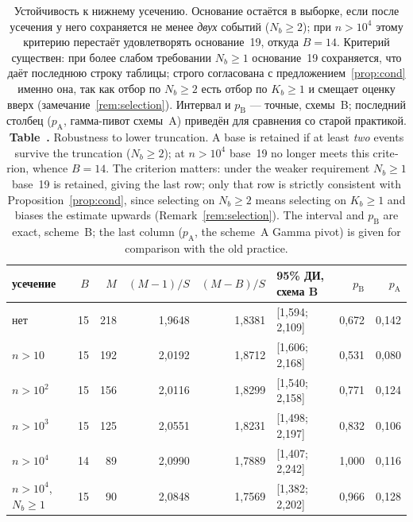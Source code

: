 \documentclass[11pt,a4paper]{article}
\newcommand{\encaptab}[1]{\\[3pt]\foreignlanguage{english}{%
  \textbf{Table~\thetable.} #1}}
\theoremstyle{plain}
\theoremstyle{remark}
\begin{document}
\begin{table}[t]
\centering
\caption{Устойчивость к нижнему усечению. Основание остаётся в выборке, если после
усечения у него сохраняется не менее \emph{двух} событий ($N_b\ge2$); при $n>10^4$ этому
критерию перестаёт удовлетворять основание~19, откуда $B=14$. Критерий существен:
при более слабом требовании $N_b\ge1$ основание~19 сохраняется, что даёт последнюю
строку таблицы; строго согласована с предложением~\ref{prop:cond} именно она, так как
отбор по $N_b\ge2$ есть отбор по $K_b\ge1$ и смещает оценку вверх
(замечание~\ref{rem:selection}). Интервал и $p_{\mathrm B}$ --- точные, схемы~B;
последний столбец ($p_{\mathrm A}$, гамма-пивот схемы~A) приведён для сравнения
со старой практикой.
\encaptab{Robustness to lower truncation. A base is retained if at least
\emph{two} events survive the truncation ($N_b\ge2$); at $n>10^4$ base~19 no longer
meets this criterion, whence $B=14$. The criterion matters: under the weaker
requirement $N_b\ge1$ base~19 is retained, giving the last row; only that row is
strictly consistent with Proposition~\ref{prop:cond}, since selecting on $N_b\ge2$
means selecting on $K_b\ge1$ and biases the estimate upwards
(Remark~\ref{rem:selection}). The interval and $p_{\mathrm B}$ are exact, scheme~B; the last column ($p_{\mathrm A}$, the scheme~A
Gamma pivot) is given for comparison with the old practice.}}
\label{tab:trunc}
\small
\begin{tabular}{lrrrrlrr}
\toprule
усечение & $B$ & $M$ & $(M-1)/S$ & $(M-B)/S$ & 95\% ДИ, схема B
& $p_{\mathrm B}$ & $p_{\mathrm A}$\\
\midrule
нет & 15 & 218 & 1{,}9648 & 1{,}8381 & [1{,}594; 2{,}109] & 0{,}672 & 0{,}142\\
$n>10$ & 15 & 192 & 2{,}0192 & 1{,}8712 & [1{,}606; 2{,}168] & 0{,}531 & 0{,}080\\
$n>10^2$ & 15 & 156 & 2{,}0116 & 1{,}8299 & [1{,}540; 2{,}158] & 0{,}771 & 0{,}124\\
$n>10^3$ & 15 & 125 & 2{,}0551 & 1{,}8231 & [1{,}498; 2{,}197] & 0{,}832 & 0{,}106\\
$n>10^4$ & 14 & 89 & 2{,}0990 & 1{,}7889 & [1{,}407; 2{,}242] & 1{,}000 & 0{,}116\\
\midrule
$n>10^4$, $N_b\ge1$ & 15 & 90 & 2{,}0848 & 1{,}7569 & [1{,}382; 2{,}202] & 0{,}966 & 0{,}128\\
\bottomrule
\end{tabular}
\end{table}
\end{document}
